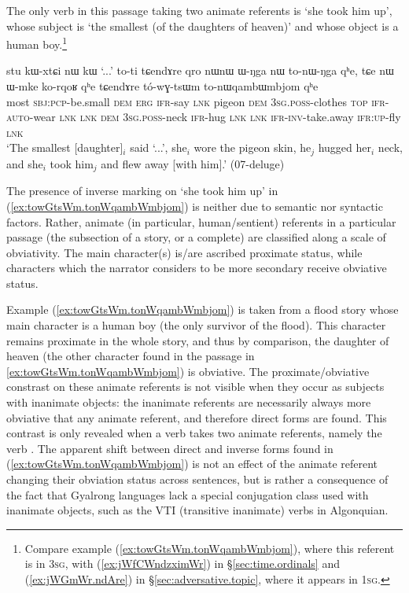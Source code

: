 The only verb in this passage taking two animate referents is  `she took him up', whose subject is  `the smallest (of the daughters of heaven)' and whose object is a human boy.\footnote{Compare example (\ref{ex:towGtsWm.tonWqambWmbjom}), where this referent is in \textsc{3sg}, with (\ref{ex:jWfCWndzximWr}) in §\ref{sec:time.ordinals} and (\ref{ex:jWGmWr.ndAre}) in §\ref{sec:adversative.topic}, where it appears in \textsc{1sg}. }
\largerpage
 \begin{exe}
\ex \label{ex:towGtsWm.tonWqambWmbjom} 
\gll stu kɯ-xtɕi nɯ kɯ `...' to-ti tɕendɤre qro nɯnɯ ɯ-ŋga nɯ to-nɯ-ŋga qʰe, tɕe nɯ ɯ-mke ko-rqoʁ qʰe tɕendɤre tó-wɣ-tsɯm to-nɯqambɯmbjom qʰe \\
most \textsc{sbj}:\textsc{pcp}-be.small \textsc{dem} \textsc{erg} { } \textsc{ifr}-say \textsc{lnk} pigeon \textsc{dem} \textsc{3sg}.\textsc{poss}-clothes \textsc{top} \textsc{ifr}-\textsc{auto}-wear \textsc{lnk} \textsc{lnk} \textsc{dem} \textsc{3sg}.\textsc{poss}-neck \textsc{ifr}-hug \textsc{lnk} \textsc{lnk} \textsc{ifr}-\textsc{inv}-take.away \textsc{ifr}:\textsc{up}-fly \textsc{lnk} \\
\glt `The smallest [daughter]$_i$ said `...', she$_i$ wore the pigeon skin, he$_j$ hugged her$_i$ neck, and she$_i$ took him$_j$ and flew away [with him].' (07-deluge)
\end{exe}

The presence of inverse marking on  `she took him up' in (\ref{ex:towGtsWm.tonWqambWmbjom}) is neither due to semantic nor syntactic factors. Rather, animate (in particular, human/sentient) referents in a particular passage (the subsection of a story, or a complete) are classified along a scale of obviativity. The main character(s) is/are ascribed proximate status, while characters which the narrator considers to be more secondary receive obviative status. 

Example (\ref{ex:towGtsWm.tonWqambWmbjom}) is taken from a flood story whose main character is a human boy (the only survivor of the flood). This character remains proximate in the whole story, and thus by comparison, the daughter of heaven (the other character found in the passage in \ref{ex:towGtsWm.tonWqambWmbjom}) is obviative. The proximate/obviative constrast on these animate referents is not visible when they occur as subjects with inanimate objects: the inanimate referents are necessarily always more obviative that any animate referent, and therefore direct forms are found. This contrast is only revealed when a verb takes two animate referents, namely the verb . The apparent shift between direct and inverse forms found in (\ref{ex:towGtsWm.tonWqambWmbjom}) is not an effect of the animate referent changing their obviation status across sentences, but is rather a consequence of the fact that Gyalrong languages lack a special conjugation class used with inanimate objects, such as the VTI (transitive inanimate) verbs in Algonquian.

